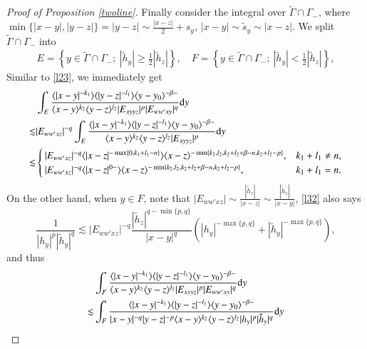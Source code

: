\documentclass[11pt,reqno]{amsart}
\def\d{{\rm d}}
\numberwithin{equation}{section}
\theoremstyle{definition}
\begin{document}
\begin{appendix}
\begin{proof}[Proof of Proposition \ref{twoline}]
		Finally consider the integral over $\tilde{\Gamma}\cap\Gamma_-$, where $\min\{|x-y|,|y-z|\}=|y-z|\sim\frac{|x-z|}{2}+s_y$, $|x-y|\sim\tilde{s}_y\sim|x-z|$. We split $\tilde{\Gamma}\cap\Gamma_-$ into
		\begin{equation*}
			\begin{split}
				E=\left\{y\in\tilde{\Gamma}\cap\Gamma_-;~|\tilde{h}_y|\geq\mbox{$\frac12$}|\tilde{h}_z|\right\},\quad F=\left\{y\in\tilde{\Gamma}\cap\Gamma_-;~|\tilde{h}_y|<\mbox{$\frac12$}|\tilde{h}_z|\right\},
			\end{split}
		\end{equation*}
		Similar to \eqref{l23}, we immediately get
		\begin{equation*}\label{l36}
			\begin{split}
				&\int_E\frac{\langle|x-y|^{-k_1}\rangle\langle|y-z|^{-l_1}\rangle\langle y-y_0\rangle^{-\beta-}}{\langle x-y\rangle^{k_2}\langle y-z\rangle^{l_2}|E_{xyyz}|^p|E_{ww'xy}|^q}\d y\\
				\lesssim&|E_{ww'xz}|^{-q}\int_E\frac{\langle|x-y|^{-k_1}\rangle\langle|y-z|^{-l_1}\rangle\langle y-y_0\rangle^{-\beta-}}{\langle x-y\rangle^{k_2}\langle y-z\rangle^{l_2}|E_{xyyz}|^p}\d y\\
				\lesssim&\begin{cases}
					|E_{ww'xz}|^{-q}\langle|x-z|^{-\max\{0,k_1+l_1-n\}}\rangle\langle x-z\rangle^{-\min\{k_2,l_2,k_2+l_2+\beta-n,k_2+l_2-p\}},&k_1+l_1\neq n,\\
					|E_{ww'xz}|^{-q}\langle|x-z|^{0-}\rangle\langle x-z\rangle^{-\min\{k_2,l_2,k_2+l_2+\beta-n,k_2+l_2-p\}},&k_1+l_1=n.
				\end{cases}
			\end{split}
		\end{equation*}
		On the other hand, when $y\in F$, note that $|E_{ww'xz}|\sim\frac{|\tilde{h}_z|}{|x-z|}\sim\frac{|\tilde{h}_z|}{|x-y|}$, \eqref{l32} also says
		\begin{equation*}
			\frac{1}{|h_y|^p|\tilde{h}_y|^q}\lesssim|E_{ww'xz}|^{-q}\frac{|\tilde{h}_z|^{q-\min\{p,q\}}}{|x-y|^q}\left(|h_y|^{-\max\{p,q\}}+|\tilde{h}_y|^{-\max\{p,q\}}\right),
		\end{equation*}
		and thus
		\begin{equation}\label{l38}
			\begin{split}
				&\int_F\frac{\langle|x-y|^{-k_1}\rangle\langle|y-z|^{-l_1}\rangle\langle y-y_0\rangle^{-\beta-}}{\langle x-y\rangle^{k_2}\langle y-z\rangle^{l_2}|E_{xyyz}|^p|E_{ww'xy}|^q}\d y\\
				\lesssim&\int_F\frac{\langle|x-y|^{-k_1}\rangle\langle|y-z|^{-l_1}\rangle\langle y-y_0\rangle^{-\beta-}}{|x-y|^{-q}|y-z|^{-p}\langle x-y\rangle^{k_2}\langle y-z\rangle^{l_2}|h_y|^p|\tilde{h}_y|^q}\d y\\

\end{split}
\end{equation}
\end{proof}
\end{appendix}
\end{document}
